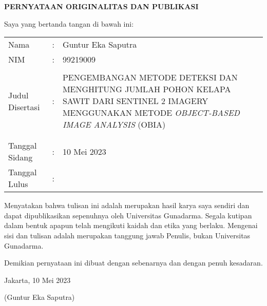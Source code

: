 \newpage %
\begin{center}
\begin{large}\textbf{PERNYATAAN ORIGINALITAS DAN PUBLIKASI}\\\end{large}
\end{center}
\vspace{1cm}
\begin{flushleft}
  Saya yang bertanda tangan di bawah ini:

\hspace{-0.2cm}\begin{tabular}{llp{10cm}}
  Nama & : & Guntur Eka Saputra\\
  NIM & : & 99219009 \\
    & &  \\
    
  Judul Disertasi & : & PENGEMBANGAN METODE DETEKSI DAN MENGHITUNG JUMLAH POHON KELAPA SAWIT DARI SENTINEL 2 IMAGERY MENGGUNAKAN METODE \textit{OBJECT-BASED IMAGE ANALYSIS} (OBIA) \\
   & &  \\
    & &  \\
    Tanggal Sidang & : & 10 Mei 2023\\
    Tanggal Lulus & : & \\
\end{tabular}


%
%
%
%
%
%
%



\end{flushleft}
Menyatakan bahwa tulisan ini adalah merupakan hasil karya saya sendiri dan dapat dipublikasikan sepenuhnya oleh Universitas Gunadarma. Segala kutipan dalam bentuk apapun telah mengikuti kaidah dan etika yang berlaku. Mengenai sisi dan tulisan adalah merupakan tanggung jawab Penulis, bukan Universitas Gunadarma.

Demikian pernyataan ini dibuat dengan sebenarnya dan dengan penuh kesadaran.
\vspace{0.5 cm}
\begin{flushleft}

Jakarta, 10 Mei 2023%

\vspace{2.5 cm}
(Guntur Eka Saputra)
\end{flushleft} 